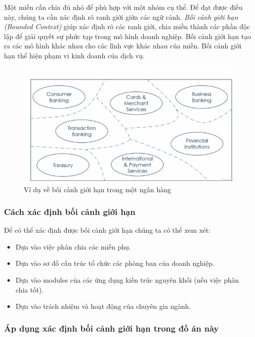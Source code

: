 Một miền cần chia đủ nhỏ để phù hợp với một nhóm cụ thể. Để đạt được điều này, chúng ta cần xác định rõ ranh giới giữa các ngữ cảnh. \emph{Bối cảnh giới hạn (Bounded Context)} giúp xác định rõ các ranh giới, chia miền thành các phần độc lập để giải quyết sự phức tạp trong mô hình doanh nghiệp. Bối cảnh giới hạn tạo ra các mô hình khác nhau cho các lĩnh vực khác nhau của miền. Bối cảnh giới hạn thể hiện phạm vi kinh doanh của dịch vụ.

\begin{figure}[H]

\centering

\includegraphics[scale = 1]{pictures/boi_canh_gioi_han/main.png}

\caption{Ví dụ về bối cảnh giới hạn trong một ngân hàng}

\end{figure}

\subsubsection{Cách xác định bối cảnh giới hạn}

Để có thể xác định được bối cảnh giới hạn chúng ta có thể xem xét:

\begin{itemize}

\item Dựa vào việc phân chia các miền phụ.

\item Dựa vào sơ đồ cấu trúc tổ chức các phòng ban của doanh nghiệp.

\item Dựa vào modules của các ứng dụng kiến trúc nguyên khối (nếu việc phân chia tốt).

\item Dựa vào trách nhiệm và hoạt động của chuyên gia ngành.

\end{itemize}



\subsubsection{Áp dụng xác định bối cảnh giới hạn trong đồ án này}


